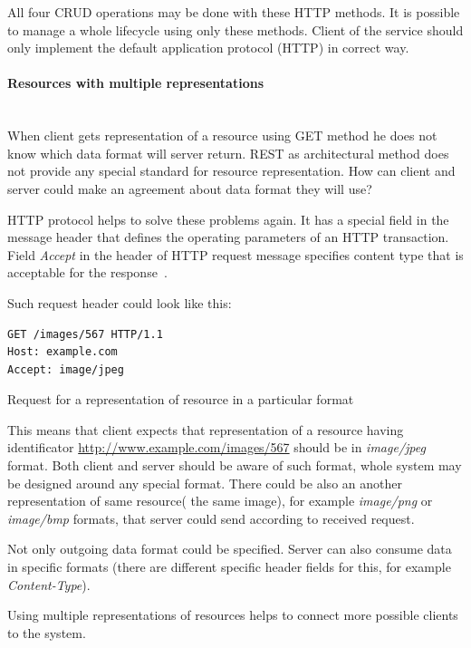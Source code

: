 All four \gls{CRUD} operations may be done with these HTTP methods. It is
possible to manage a whole lifecycle using only these methods. Client of the
service should only implement   the default application protocol (HTTP)
in correct way.

\paragraph{Resources with multiple representations} ~\\
\label{sec:rest_multiple_resource_types}
When client gets representation of a resource using GET method he does not know
which data format will server return. REST as architectural method does not
provide any special standard for resource representation. How can client and
server could make an agreement about data format they will use?


HTTP protocol helps to solve these problems again. 
It has a special field in the message header that defines the operating parameters of an HTTP
transaction. Field \textit{Accept} in the header of HTTP request message
specifies content type that is acceptable for the response~\cite{http-rfc}.

Such request header could look like this:

\begin{listing}[H]
\begin{verbatim}
GET /images/567 HTTP/1.1
Host: example.com
Accept: image/jpeg
\end{verbatim}
\caption{Request for a representation of resource in a particular format}
\label{lst:http_accept_example}
\end{listing}

This means that client expects that representation of a resource having
identificator \url{http://www.example.com/images/567} should be in
\textit{image/jpeg} format. Both client and server should be aware of such
format, whole system may be designed around any special format. 
There could be also an another representation of same resource( the same image),
for example \textit{image/png} or \textit{image/bmp} formats, that server could
send according to received request. 

Not only outgoing data format could be specified. Server can also consume data
in specific formats (there are different specific header fields for this, for
example \textit{Content-Type}).

Using multiple representations of resources helps to connect more possible
clients to the system.


